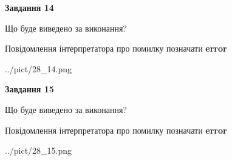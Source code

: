 \documentclass[11pt, ukrainian]{article}
\begin{document}
{\begin {large}
{\begin {center}\textbf{Завдання 14}\end {center}}\par
Що буде виведено за виконання? \par
Повідомлення інтерпретатора про помилку позначати \textbf{error}

\begin{center}
	{../pict/28_14.png}
\end{center}
\newpage

{\begin {center}\textbf{Завдання 15}\end {center}}\par
Що буде виведено за виконання? \par
Повідомлення інтерпретатора про помилку позначати \textbf{error}

\begin{center}
	{../pict/28_15.png}
\end{center}
\newpage

\end {large}}
\end{document}
